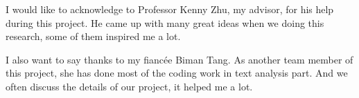 I would like to acknowledge to Professor Kenny Zhu, my advisor, for his help during this project. He came up with many great ideas when we doing this research, some of them inspired me a lot.

I also want to say thanks to my fianc\'{e}e Biman Tang. As another team member of this project, she has done most of the coding work in text analysis part. And we often discuss the details of our project, it helped me a lot.

